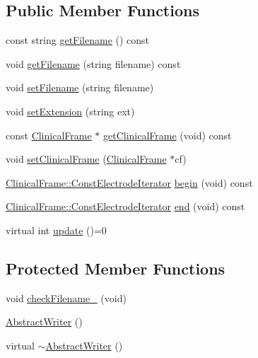 \subsection*{Public Member Functions}
\begin{DoxyCompactItemize}
\item 
const string \hyperlink{classAbstractWriter_ae2cdd50fc9b39e6ded80bb7d9cea55b0}{get\-Filename} () const 
\item 
void \hyperlink{classAbstractWriter_ab743677bd3db72113a57188093425306}{get\-Filename} (string filename) const 
\item 
void \hyperlink{classAbstractWriter_ac13745f7801378b8231bb54c45490dbe}{set\-Filename} (string filename)
\item 
void \hyperlink{classAbstractWriter_ab1bb7069f6b7886cb46718fb4c9eff5c}{set\-Extension} (string ext)
\item 
const \hyperlink{classClinicalFrame}{Clinical\-Frame} $\ast$ \hyperlink{classAbstractWriter_ae43ecbb0fbb883629ea44a7a7c906e1a}{get\-Clinical\-Frame} (void) const 
\item 
void \hyperlink{classAbstractWriter_a64827ba205471ae1d9fa9e5d890f3335}{set\-Clinical\-Frame} (\hyperlink{classClinicalFrame}{Clinical\-Frame} $\ast$cf)
\item 
\hyperlink{classClinicalFrame_ab741d0da22f344965de240de63c8a381}{Clinical\-Frame\-::\-Const\-Electrode\-Iterator} \hyperlink{classAbstractWriter_a02d123991818324034406e38c30bce1d}{begin} (void) const 
\item 
\hyperlink{classClinicalFrame_ab741d0da22f344965de240de63c8a381}{Clinical\-Frame\-::\-Const\-Electrode\-Iterator} \hyperlink{classAbstractWriter_a21776d6dc864b6cdadd49791ccfc6677}{end} (void) const 
\item 
virtual int \hyperlink{classAbstractWriter_ae3d1e946840352b28b092902664a1115}{update} ()=0
\end{DoxyCompactItemize}
\subsection*{Protected Member Functions}
\begin{DoxyCompactItemize}
\item 
void \hyperlink{classAbstractWriter_a75c621b83faaa753dddcb24d45f96d44}{check\-Filename\-\_\-} (void)
\item 
\hyperlink{classAbstractWriter_a56e1e861dc5b9ec7d6de79e6701fd06d}{Abstract\-Writer} ()
\item 
virtual \hyperlink{classAbstractWriter_a8d2dcb8b137bc04f8c22ec57ac59ed4e}{$\sim$\-Abstract\-Writer} ()
\end{DoxyCompactItemize}


